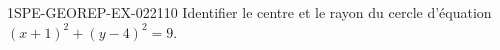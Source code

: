 \begin{exercice}{1SPE-GEOREP-EX-022}{1}{10}
Identifier le centre et le rayon du cercle d'équation $(x + 1)^2 + (y - 4)^2 = 9$.
\end{exercice}
